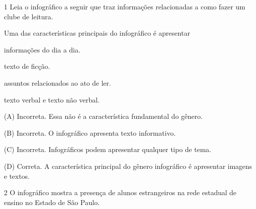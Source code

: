 \begin{escolha}

\num{1} Leia o infográfico a seguir que traz informações relacionadas a
como fazer um clube de leitura.



Uma das características principais do infográfico é apresentar

\begin{boxlist}
\item informações do dia a dia.

\item texto de ficção.

\item assuntos relacionados ao ato de ler.

\item texto verbal e texto não verbal.
\end{boxlist}


(A) Incorreta. Essa não é a característica fundamental do gênero.

(B) Incorreta. O infográfico apresenta texto informativo.

(C) Incorreta. Infográficos podem apresentar qualquer tipo de tema.

(D) Correta. A característica principal do gênero infográfico é
apresentar imagens e textos.

\num{2} O infográfico mostra a presença de alunos estrangeiros na rede
estadual de ensino no Estado de São Paulo.




\end{escolha}
